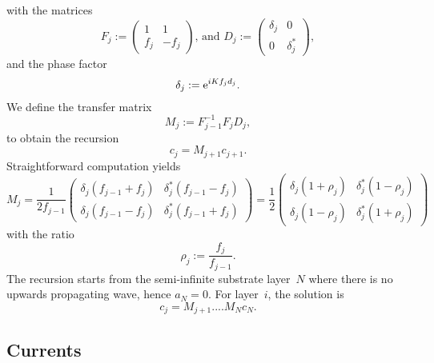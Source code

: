 with the matrices
\begin{equation}
  F_j := \left(\begin{array}{cc}1&1\\f_j&-f_j\end{array}\right)\text{, and }
  D_j := \left(\begin{array}{cc}\delta_j&0\\0&\delta_j^*\end{array}\right),
\end{equation}
and the phase factor
\begin{equation}
   \delta_j := \text{e}^{iKf_jd_j}.
\end{equation}
We define the transfer matrix
\begin{equation}\label{Edef_M}
  M_j
  := F_{j-1}^{-1}F_j D_j,
\end{equation}
to obtain the recursion 
\begin{equation}\label{EcMc}
  c_j = M_{j+1} c_{j+1}.
\end{equation}
Straightforward computation yields
\begin{equation}
  M_j
   = \frac{1}{2f_{j-1}}
   \left(\begin{array}{cc}
       \delta_j(f_{j-1}+f_j)&\delta_j^*(f_{j-1}-f_j)\\
       \delta_j(f_{j-1}-f_j)&\delta_j^*(f_{j-1}+f_j)
   \end{array}\right)
   = \frac{1}{2}
   \left(\begin{array}{cc}
       \delta_j(1+\rho_j)&\delta_j^*(1-\rho_j)\\
       \delta_j(1-\rho_j)&\delta_j^*(1+\rho_j)
   \end{array}\right)
\end{equation}
with the ratio
\begin{equation}
  \rho_j := \frac{f_j}{f_{j-1}}.
\end{equation}
The recursion starts from the semi-infinite substrate layer~$N$
where there is no upwards propagating wave, hence $a_N=0$.
For layer~$i$, the solution is
\begin{equation}\label{Eci}
  c_j
  =
  M_{j+1}.... M_{N} c_N.  %
\end{equation}

\subsection{Currents}

